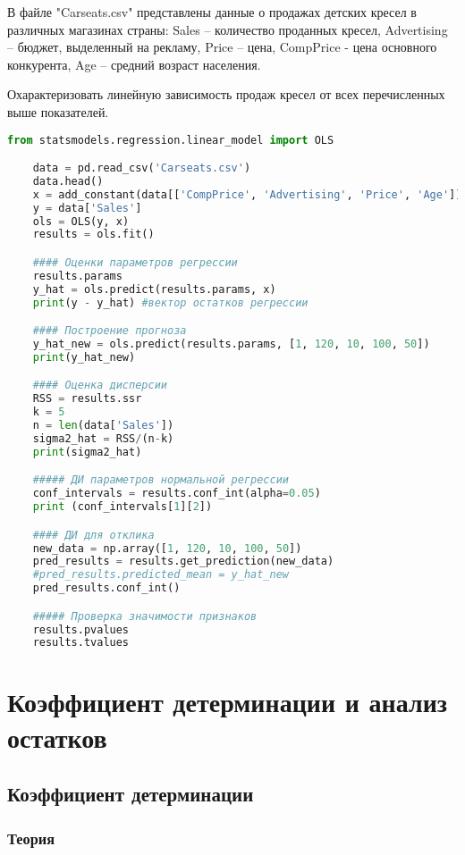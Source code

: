 \begin{problem}
	В файле "Carseats.csv" представлены данные о продажах детских кресел в различных магазинах страны: Sales – количество проданных кресел, Advertising – бюджет, выделенный на рекламу, Price – цена, CompPrice - цена основного конкурента, Age – средний возраст населения.

	Охарактеризовать линейную зависимость продаж кресел от всех перечисленных выше показателей.
\end{problem}
\begin{lstlisting}[language=Python]
	from statsmodels.regression.linear_model import OLS

	data = pd.read_csv('Carseats.csv')
	data.head()
	x = add_constant(data[['CompPrice', 'Advertising', 'Price', 'Age']])
	y = data['Sales'] 
	ols = OLS(y, x)
	results = ols.fit()

	#### Оценки параметров регрессии
	results.params
	y_hat = ols.predict(results.params, x)
	print(y - y_hat) #вектор остатков регрессии

	#### Построение прогноза
	y_hat_new = ols.predict(results.params, [1, 120, 10, 100, 50])
	print(y_hat_new)

	#### Оценка дисперсии
	RSS = results.ssr
	k = 5
	n = len(data['Sales'])
	sigma2_hat = RSS/(n-k)
	print(sigma2_hat)

	##### ДИ параметров нормальной регрессии
	conf_intervals = results.conf_int(alpha=0.05)
	print (conf_intervals[1][2])

	#### ДИ для отклика
	new_data = np.array([1, 120, 10, 100, 50])
	pred_results = results.get_prediction(new_data)
	#pred_results.predicted_mean = y_hat_new
	pred_results.conf_int()

	##### Проверка значимости признаков
	results.pvalues
	results.tvalues
\end{lstlisting}

\section{Коэффициент детерминации и анализ остатков}\label{cha:linreg/sec:det+ost}

\subsection*{Коэффициент детерминации}\label{cha:linreg/sec:det+ost/subsec:det}

\subsubsection*{Теория}\label{cha:linreg/sec:det+ost/subsec:det/subsubsec:theory}


